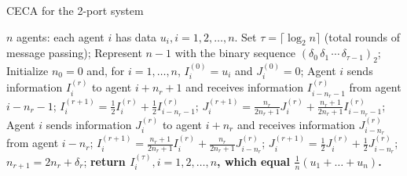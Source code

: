 \documentclass{article}
\newcommand{\ro}{{(r)}}
\theoremstyle{plain}
\theoremstyle{definition}
\begin{document}
\begin{algorithm}[tb]
   \caption{CECA for the 2-port system}
   \label{alg:opt-2p}
\begin{algorithmic}
    $n$ agents: each agent $i$ has data $u_i, i=1,2,\ldots,n$.
   \STATE Set $\tau=\lceil \log_2n \rceil$ (total rounds of message passing);
   \STATE Represent $n-1$ with the binary sequence $(\delta_0\,\delta_1\,\cdots\, \delta_{\tau-1} )_2$;
   \STATE Initialize $n_0=0$ and, for $i=1,\dots,n$, $I^{(0)}_i=u_i$ and $ J^{(0)}_i=0$;
   \STATE Agent $i$ sends information $I^\ro_i$ to agent $i+n_r+1$ and receives information $I^\ro_{i-n_r-1}$ from agent $i-n_r-1$;
   \STATE $
    I^{(r+1)}_i=\frac{1}{2}I^\ro_i+\frac{1}{2}I^\ro_{i-n_r-1}$;
   \STATE$
    J^{(r+1)}_i=\frac{n_r}{2n_r+1}J^\ro_i+\frac{n_r+1}{2n_r+1}I^\ro_{i-n_r-1}
    $;
   \STATE Agent $i$ sends information $J^\ro_i$ to agent $i+n_r$ and receives information $J^\ro_{i-n_r}$ from agent $i-n_r$;
   \STATE $
    I^{(r+1)}_i=\frac{n_r+1}{2n_r+1}I^\ro_i+\frac{n_r}{2n_r+1}J^\ro_{i-n_r}$;
   \STATE$
    J^{(r+1)}_i=\frac{1}{2}J^\ro_i+\frac{1}{2}J^\ro_{i-n_r}
    $;
   \ENDIF 
   \STATE $n_{r+1}=2n_r+\delta_r$;
   \ENDFOR
   \STATE \bfseries{return} $I^{(\tau)}_i, i=1,2,\ldots,n$, which equal $\frac{1}{n}(u_1+\dots+u_n)$.
\end{algorithmic}
\end{algorithm}
\end{document}
